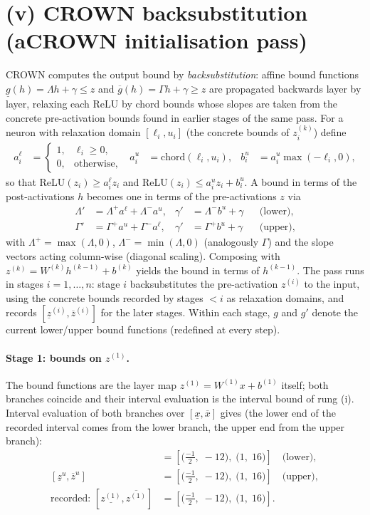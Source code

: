 \documentclass[11pt]{article}
\begin{document}
\section{(v) CROWN backsubstitution (aCROWN initialisation pass)}
CROWN computes the output bound by \emph{backsubstitution}: affine bound functions
$\underline{g}(h) = \Lambda h + \gamma \le z$ and $\overline{g}(h) = \Gamma h + \gamma \ge z$
are propagated backwards layer by layer, relaxing each ReLU by chord bounds whose slopes are taken
from the concrete pre-activation bounds found in earlier stages of the same pass. For a neuron with
relaxation domain $[\ell_i, u_i]$ (the concrete bounds of $z^{(k)}_i$) define
\begin{align*}
a^{\ell}_i &= \begin{cases} 1, & \ell_i \ge 0,\\ 0, & \text{otherwise}, \end{cases} & a^{u}_i &= \mathrm{chord}(\ell_i, u_i), & b^{u}_i &= a^{u}_i \max(-\ell_i, 0),
\end{align*}
so that $\mathrm{ReLU}(z_i) \ge a^{\ell}_i z_i$ and
$\mathrm{ReLU}(z_i) \le a^{u}_i z_i + b^{u}_i$. A bound in terms of the post-activations $h$ becomes
one in terms of the pre-activations $z$ via
\begin{align*}
\Lambda' &= \Lambda^{+} a^{\ell} + \Lambda^{-} a^{u}, & \gamma' &= \Lambda^{-} b^{u} + \gamma && \text{(lower)}, \\ 
\Gamma' &= \Gamma^{+} a^{u} + \Gamma^{-} a^{\ell}, & \gamma' &= \Gamma^{+} b^{u} + \gamma && \text{(upper)},
\end{align*}
with $\Lambda^{+} = \max(\Lambda, 0)$, $\Lambda^{-} = \min(\Lambda, 0)$ (analogously $\Gamma$) and the
slope vectors acting column-wise (diagonal scaling). Composing with
$z^{(k)} = W^{(k)} h^{(k-1)} + b^{(k)}$ yields the bound in terms of $h^{(k-1)}$. The pass runs in
stages $i = 1, \dots, n$: stage $i$ backsubstitutes the pre-activation $z^{(i)}$ to the input, using
the concrete bounds recorded by stages $< i$ as relaxation domains, and records
$[\underline{z}^{(i)}, \overline{z}^{(i)}]$ for the later stages. Within each stage, $g$ and $g'$
denote the current lower/upper bound functions (redefined at every step).
\paragraph{Stage 1: bounds on $z^{(1)}$.}
The bound functions are the layer map $z^{(1)} = W^{(1)} x + b^{(1)}$ itself; both branches coincide and their interval evaluation is the interval bound of rung (i).
Interval evaluation of both branches over $[\underline{x}, \overline{x}]$ gives (the lower end of the recorded interval comes from the lower branch, the upper end from the upper branch):
\begin{align*}
[\underline{z}^{\ell}, \overline{z}^{\ell}] &= [\bigl(\frac{-1}{2},\; -12\bigr),\; \bigl(1,\; 16\bigr)] \quad\text{(lower)}, \\
[\underline{z}^{u}, \overline{z}^{u}] &= [\bigl(\frac{-1}{2},\; -12\bigr),\; \bigl(1,\; 16\bigr)] \quad\text{(upper)}, \\
\text{recorded: } [\underline{z^{(1)}}, \overline{z^{(1)}}] &= [\bigl(\frac{-1}{2},\; -12\bigr),\; \bigl(1,\; 16\bigr)].
\end{align*}
\end{document}

